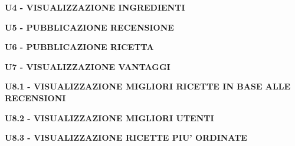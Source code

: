 \textbf{U4 - VISUALIZZAZIONE INGREDIENTI}



\vspace{2em}

\textbf{U5 - PUBBLICAZIONE RECENSIONE}



\vspace{2em}

\textbf{U6 - PUBBLICAZIONE RICETTA}



\vspace{2em}

\textbf{U7 - VISUALIZZAZIONE VANTAGGI}



\vspace{2em}

\textbf{U8.1 - VISUALIZZAZIONE MIGLIORI RICETTE IN BASE ALLE RECENSIONI}



\vspace{2em}

\textbf{U8.2 - VISUALIZZAZIONE MIGLIORI UTENTI}



\vspace{2em}

\textbf{U8.3 - VISUALIZZAZIONE RICETTE PIU' ORDINATE}



\vspace{2em}

